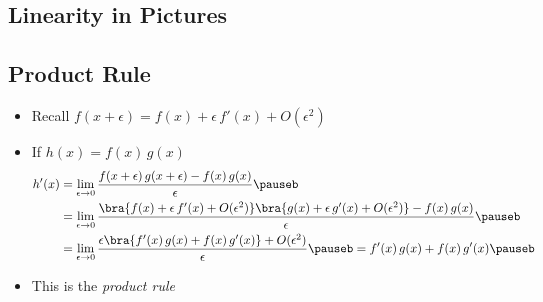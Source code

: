 
\begin{slide}
\section[-1]{Linearity in Pictures}

 \pb \pause {}
  \begin{center}
    \pause
  \end{center}

\end{slide}


\begin{slide}
  \section{Product Rule}

\begin{PauseHighLight}
  \begin{itemize}
  \item Recall $f(x+\epsilon) = f(x) + \epsilon\, f'(x) + O(\epsilon^2)$
  \item If $h(x) = f(x)\, g(x)$\pause
    {\small
    \begin{align*}
      h'(x) &= \lim_{\epsilon\rightarrow 0}
      \frac{f(x+\epsilon)\,g(x+\epsilon)-f(x)\,g(x)}{\epsilon}\pauseb \\
      &= \lim_{\epsilon\rightarrow 0} \frac{\bra{f(x) + \epsilon\, f'(x) +
    O(\epsilon^2)} \bra{g(x) + \epsilon\, g'(x) +
              O(\epsilon^2)}-f(x)\,g(x)}{\epsilon}\pauseb \\
      &= \lim_{\epsilon\rightarrow 0} \frac{\epsilon \bra{f'(x)\,g(x) +
        f(x)\,g'(x)}+O(\epsilon^2)}{\epsilon}\pauseb
        = f'(x)\,g(x) + f(x)\,g'(x)\pauseb
    \end{align*}}
  \item This is the \emph{product rule}\pauseb
  \end{itemize}
\end{PauseHighLight}

\end{slide}


